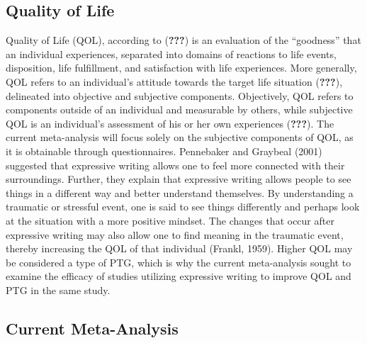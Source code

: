 \documentclass[english,man, mask]{apa6}
\theoremstyle{definition}
\theoremstyle{definition}
\theoremstyle{definition}
\theoremstyle{remark}
\begin{document}
\subsection{Quality of Life}\label{quality-of-life}

Quality of Life (QOL), according to ({\textbf{???}}) is an evaluation of
the \enquote{goodness} that an individual experiences, separated into
domains of reactions to life events, disposition, life fulfillment, and
satisfaction with life experiences. More generally, QOL refers to an
individual's attitude towards the target life situation
({\textbf{???}}), delineated into objective and subjective components.
Objectively, QOL refers to components outside of an individual and
measurable by others, while subjective QOL is an individual's assessment
of his or her own experiences ({\textbf{???}}). The current
meta-analysis will focus solely on the subjective components of QOL, as
it is obtainable through questionnaires. Pennebaker and Graybeal (2001)
suggested that expressive writing allows one to feel more connected with
their surroundings. Further, they explain that expressive writing allows
people to see things in a different way and better understand
themselves. By understanding a traumatic or stressful event, one is said
to see things differently and perhaps look at the situation with a more
positive mindset. The changes that occur after expressive writing may
also allow one to find meaning in the traumatic event, thereby
increasing the QOL of that individual (Frankl, 1959). Higher QOL may be
considered a type of PTG, which is why the current meta-analysis sought
to examine the efficacy of studies utilizing expressive writing to
improve QOL and PTG in the same study.

\subsection{Current Meta-Analysis}\label{current-meta-analysis}
\end{document}
